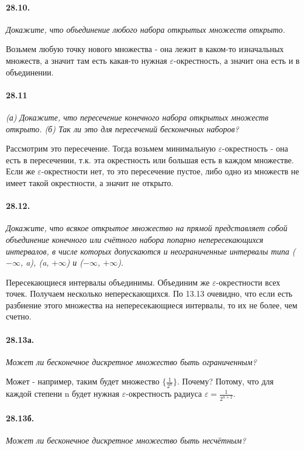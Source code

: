 \documentclass{book}
\begin{document}
\paragraph{28.10.}
\textit{Докажите, что объединение любого набора открытых множеств открыто.}

Возьмем любую точку нового множества - она лежит в каком-то изначальных множеств, а значит там есть какая-то нужная $\varepsilon$-окрестность, а значит она есть и в объединении.\

\paragraph{28.11}
\textit{(а) Докажите, что пересечение конечного набора открытых множеств открыто. (б) Так ли это для пересечений бесконечных наборов?}

Рассмотрим это пересечение. Тогда возьмем минимальную $\varepsilon$-окрестность - она есть в пересечении, т.к. эта окрестность или большая есть в каждом множестве. Если же $\varepsilon$-окрестности нет, то это пересечение пустое, либо одно из множеств не имеет такой окрестности, а значит не открыто.

\paragraph{28.12.}
\textit{Докажите, что всякое открытое множество на прямой представляет собой объединение конечного или счётного набора попарно непересекающихся интервалов, в числе которых допускаются и неограниченные интервалы типа ($-\infty$, a), (a, $+\infty$) и ($-\infty$, $+\infty$).}

Пересекающиеся интервалы объединимы. Объединим же $\varepsilon$-окрестности всех точек. Получаем несколько неперескающихся. По 13.13 очевидно, что если есть разбиение этого множества на непересекающиеся интервалы, то их не более, чем счетно.


\paragraph{28.13а.}
\textit{Может ли бесконечное дискретное множество быть ограниченным?}

Может - например, таким будет множество $\{\frac{1}{2^n}\}$. Почему? Потому, что для каждой степени n будет нужная $\varepsilon$-окрестность радиуса $\varepsilon = \frac{1}{2^{n+2}}$.

\paragraph{28.13б.}
\textit{Может ли бесконечное дискретное множество быть несчётным?}
\end{document}
